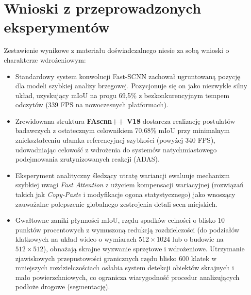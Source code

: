\section{Wnioski z przeprowadzonych eksperymentów}
Zestawienie wynikowe z materiału doświadczalnego niesie za sobą wnioski o charakterze wdrożeniowym:
\begin{itemize}
  \item Standardowy system konwolucji Fast-SCNN zachował ugruntowaną pozycję dla modeli szybkiej analizy brzegowej. Pozycjonuje się on jako niezwykle silny układ, uzyskujący mIoU na progu 69,5\% z bezkonkurencyjnym tempem odczytów (339 FPS na nowoczesnych platformach).
  \item Zrewidowana struktura \textbf{FAscnn++ V18} dostarcza realizację postulatów badawczych z ostatecznym celownikiem 70,68\% mIoU przy minimalnym zniekształceniu ułamka referencyjnej szybkości (powyżej 340 FPS), udowadniając celowość z wdrożenia do systemów natychmiastowego podejmowania zrutynizowanych reakcji (ADAS).
  \item Eksperyment analityczny śledzący utratę wariancji ewaluuje mechanizm szybkiej uwagi \textit{Fast Attention} z użyciem kompensacji wariacyjnej (rozwiązań takich jak \textit{Copy-Paste} i modyfikacje ogona statystycznego) jako wnoszący zauważalne polepszenie globalnego zestrojenia detali scen miejskich.
  \item Gwałtowne zaniki płynności mIoU, rzędu spadków celności o blisko 10 punktów procentowych z wymuszoną redukcją rozdzielczości (do podziałów klatkowych na układ wideo o wymiarach $512 \times 1024$ lub o budowie na $512 \times 512$), obnażają skrajne wyzwanie sprzętowe i wdrożeniowe. Utrzymanie zjawiskowych przepustowości granicznych rzędu blisko 600 klatek w mniejszych rozdzielczościach osłabia system detekcji obiektów skrajnych i mało powierzchniowych, co ogranicza wiarygodność procedur analizujących podłoże drogowe (segmentację).
\end{itemize}
